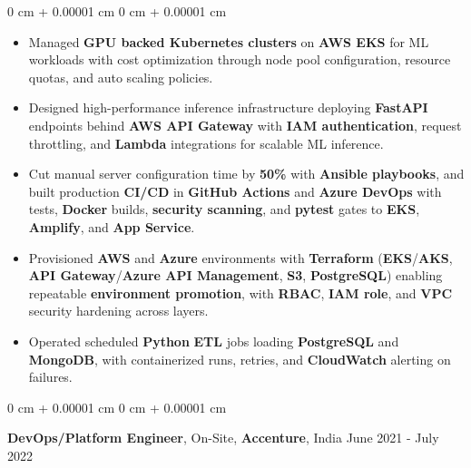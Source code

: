 \documentclass[10pt, letterpaper]{article}
\newenvironment{highlights}{
    \begin{itemize}[
        topsep=0.02 cm,
        parsep=0.02 cm,
        partopsep=0pt,
        itemsep=0pt,
        leftmargin=0 cm + 10pt
    ]
}{
    \end{itemize}
} %
\newenvironment{onecolentry}{
    \begin{adjustwidth}{
        0 cm + 0.00001 cm
    }{
        0 cm + 0.00001 cm
    }
}{
    \end{adjustwidth}
} %
\newcommand{\resumeheading}[2]{%
    \begin{onecolentry}
        #1 \hfill #2
    \end{onecolentry}
} %
\begin{document}
\begin{onecolentry}
\begin{highlights}
	\item Managed \textbf{GPU backed Kubernetes clusters} on \textbf{AWS EKS} for ML workloads with cost optimization through node pool configuration, resource quotas, and auto scaling policies.
	\item Designed high-performance inference infrastructure deploying \textbf{FastAPI} endpoints behind \textbf{AWS API Gateway} with \textbf{IAM authentication}, request throttling, and \textbf{Lambda} integrations for scalable ML inference.
	\item Cut manual server configuration time by \textbf{50\%} with \textbf{Ansible playbooks}, and built production \textbf{CI/CD} in \textbf{GitHub Actions} and \textbf{Azure DevOps} with tests, \textbf{Docker} builds, \textbf{security scanning}, and \textbf{pytest} gates to \textbf{EKS}, \textbf{Amplify}, and \textbf{App Service}.
	\item Provisioned \textbf{AWS} and \textbf{Azure} environments with \textbf{Terraform} (\textbf{EKS}/\textbf{AKS}, \textbf{API Gateway}/\textbf{Azure API Management}, \textbf{S3}, \textbf{PostgreSQL}) enabling repeatable \textbf{environment promotion}, with \textbf{RBAC}, \textbf{IAM role}, and \textbf{VPC} security hardening across layers.
	\item Operated scheduled \textbf{Python} \textbf{ETL} jobs loading \textbf{PostgreSQL} and \textbf{MongoDB}, with containerized runs, retries, and \textbf{CloudWatch} alerting on failures.
\end{highlights}
\end{onecolentry}




\vspace{0.12 cm}
\resumeheading{\textbf{DevOps/Platform Engineer}, On-Site, \textbf{Accenture}, India}{June 2021 - July 2022}
\end{document}
